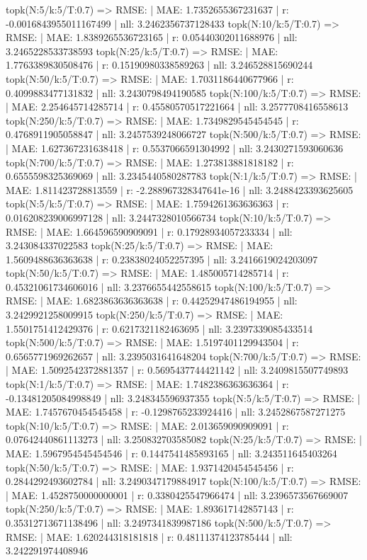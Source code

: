 topk(N:5/k:5/T:0.7) => RMSE: | MAE: 1.7352655367231637 | r: -0.0016843955011167499 | nll: 3.2462356737128433
topk(N:10/k:5/T:0.7) => RMSE: | MAE: 1.8389265536723165 | r: 0.05440302011688976 | nll: 3.2465228533738593
topk(N:25/k:5/T:0.7) => RMSE: | MAE: 1.7763389830508476 | r: 0.15190980338589263 | nll: 3.246528815690244
topk(N:50/k:5/T:0.7) => RMSE: | MAE: 1.7031186440677966 | r: 0.4099883477131832 | nll: 3.2430798494190585
topk(N:100/k:5/T:0.7) => RMSE: | MAE: 2.254645714285714 | r: 0.45580570517221664 | nll: 3.2577708416558613
topk(N:250/k:5/T:0.7) => RMSE: | MAE: 1.7349829545454545 | r: 0.4768911905058847 | nll: 3.2457539248066727
topk(N:500/k:5/T:0.7) => RMSE: | MAE: 1.627367231638418 | r: 0.5537066591304992 | nll: 3.2430271593060636
topk(N:700/k:5/T:0.7) => RMSE: | MAE: 1.273813881818182 | r: 0.6555598325369069 | nll: 3.2345440580287783
topk(N:1/k:5/T:0.7) => RMSE: | MAE: 1.811423728813559 | r: -2.288967328347641e-16 | nll: 3.2488423393625605
topk(N:5/k:5/T:0.7) => RMSE: | MAE: 1.7594261363636363 | r: 0.016208239006997128 | nll: 3.2447328010566734
topk(N:10/k:5/T:0.7) => RMSE: | MAE: 1.664596590909091 | r: 0.17928934057233334 | nll: 3.243084337022583
topk(N:25/k:5/T:0.7) => RMSE: | MAE: 1.5609488636363638 | r: 0.23838024052257395 | nll: 3.2416619024203097
topk(N:50/k:5/T:0.7) => RMSE: | MAE: 1.485005714285714 | r: 0.45321061734606016 | nll: 3.2376655442558615
topk(N:100/k:5/T:0.7) => RMSE: | MAE: 1.6823863636363638 | r: 0.44252947486194955 | nll: 3.2429921258009915
topk(N:250/k:5/T:0.7) => RMSE: | MAE: 1.5501751412429376 | r: 0.6217321182463695 | nll: 3.2397339085433514
topk(N:500/k:5/T:0.7) => RMSE: | MAE: 1.5197401129943504 | r: 0.6565771969262657 | nll: 3.2395031641648204
topk(N:700/k:5/T:0.7) => RMSE: | MAE: 1.5092542372881357 | r: 0.5695437744421142 | nll: 3.2409815507749893
topk(N:1/k:5/T:0.7) => RMSE: | MAE: 1.7482386363636364 | r: -0.13481205084998849 | nll: 3.248345596937355
topk(N:5/k:5/T:0.7) => RMSE: | MAE: 1.7457670454545458 | r: -0.1298765233924416 | nll: 3.2452867587271275
topk(N:10/k:5/T:0.7) => RMSE: | MAE: 2.013659090909091 | r: 0.07642440861113273 | nll: 3.250832703585082
topk(N:25/k:5/T:0.7) => RMSE: | MAE: 1.5967954545454546 | r: 0.1447541485893165 | nll: 3.243511645403264
topk(N:50/k:5/T:0.7) => RMSE: | MAE: 1.9371420454545456 | r: 0.2844292493602784 | nll: 3.2490347179884917
topk(N:100/k:5/T:0.7) => RMSE: | MAE: 1.4528750000000001 | r: 0.3380425547966474 | nll: 3.2396573567669007
topk(N:250/k:5/T:0.7) => RMSE: | MAE: 1.893617142857143 | r: 0.35312713671138496 | nll: 3.2497341839987186
topk(N:500/k:5/T:0.7) => RMSE: | MAE: 1.620244318181818 | r: 0.48111374123785444 | nll: 3.242291974408946
